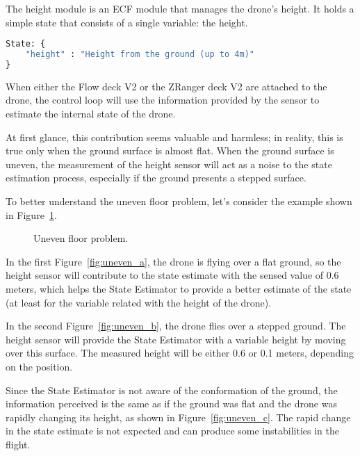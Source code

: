 The height module is an ECF module that manages the drone's height. It holds a simple state that consists of a single variable: the height.
\begin{lstlisting}[language=Python]
State: {
    "height" : "Height from the ground (up to 4m)"
}
\end{lstlisting}

When either the Flow deck V2 or the ZRanger deck V2 are attached to the drone, the control loop will use the information provided by the sensor to estimate the internal state of the drone.

At first glance, this contribution seems valuable and harmless; in reality, this is true only when the ground surface is almost flat.
When the ground surface is uneven, the measurement of the height sensor will act as a noise to the state estimation process, especially if the ground presents a stepped surface.

To better understand the uneven floor problem, let's consider the example shown in Figure~\ref{fig:uneven_floor}.

\begin{figure}[h]
    \centering
    \quad
    \quad
    \caption{Uneven floor problem.}\label{fig:uneven_floor}
\end{figure}

In the first Figure~\ref{fig:uneven_a}, the drone is flying over a flat ground, so the height sensor will contribute to the state estimate with the sensed value of 0.6 meters, which helps the State Estimator to provide a better estimate of the state (at least for the variable related with the height of the drone).

In the second Figure~\ref{fig:uneven_b}, the drone flies over a stepped ground. 
The height sensor will provide the State Estimator with a variable height by moving over this surface. 
The measured height will be either 0.6 or 0.1 meters, depending on the position.

Since the State Estimator is not aware of the conformation of the ground, the information perceived is the same as if the ground was flat and the drone was rapidly changing its height, as shown in Figure~\ref{fig:uneven_c}. 
The rapid change in the state estimate is not expected and can produce some instabilities in the flight.

